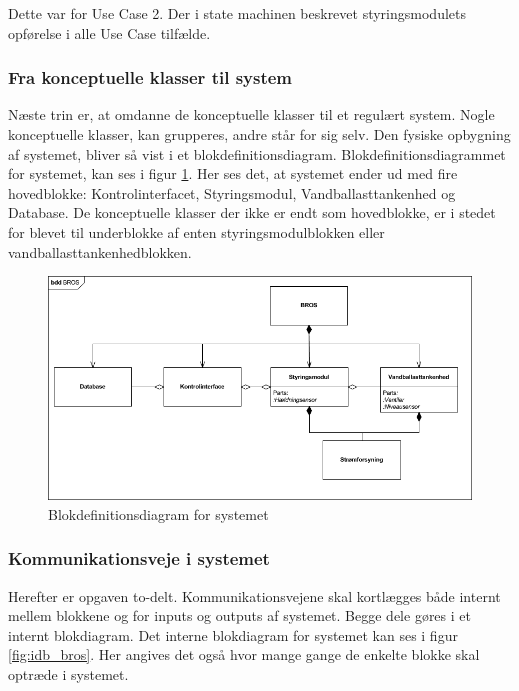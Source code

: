 Dette var for Use Case 2. Der i state machinen beskrevet styringsmodulets opførelse i alle Use Case tilfælde. 

\subsubsection{Fra konceptuelle klasser til system}
Næste trin er, at omdanne de konceptuelle klasser til et regulært system. Nogle konceptuelle klasser, kan grupperes, andre står for sig selv. Den fysiske opbygning af systemet, bliver så vist i et blokdefinitionsdiagram. Blokdefinitionsdiagrammet for systemet, kan ses i figur \ref{fig:bdd_bros}. Her ses det, at systemet ender ud med fire hovedblokke: Kontrolinterfacet, Styringsmodul, Vandballasttankenhed og Database. De konceptuelle klasser der ikke er endt som hovedblokke, er i stedet for blevet til underblokke af enten styringsmodulblokken eller vandballasttankenhedblokken.

\begin{figure}[htbp]
\centering
\includegraphics[scale=0.5]{billeder/Systemarkitektur/bdd_bros}
\caption{Blokdefinitionsdiagram for systemet}
\label{fig:bdd_bros}
\end{figure}

\subsubsection{Kommunikationsveje i systemet}
Herefter er opgaven to-delt. Kommunikationsvejene skal kortlægges både internt mellem blokkene og for inputs og outputs af systemet. Begge dele gøres i et internt blokdiagram. Det interne blokdiagram for systemet kan ses i figur \ref{fig:idb_bros}. Her angives det også hvor mange gange de enkelte blokke skal optræde i systemet.\\

